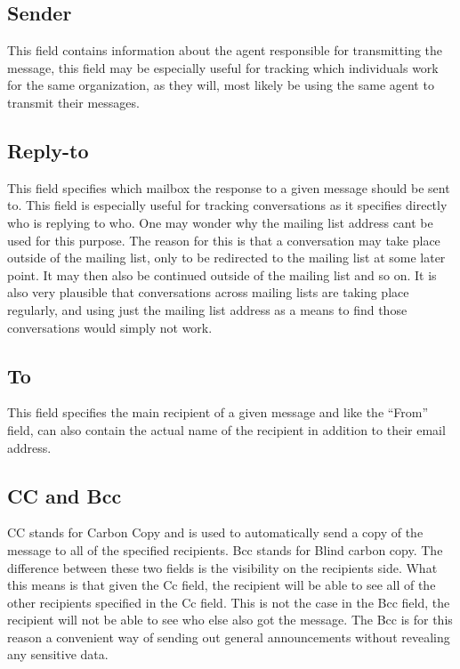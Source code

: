 \documentclass[a4paper,english]{report}
\begin{document}
\subsection{Sender}
This field contains information about the agent responsible for transmitting the message, this field may be especially useful for tracking which individuals work for the same organization, as they will, most likely be using the same agent to transmit their messages.


\subsection{Reply-to}
This field specifies which mailbox the response to a given message should be sent to.
This field is especially useful for tracking conversations as it specifies directly who is replying to who. One may wonder why the mailing list address cant be used for this purpose.
The reason for this is that a conversation may take place outside of the mailing list, only to be redirected to the mailing list at some later point. It may then also be continued outside of the mailing list and so on. It is also very plausible that conversations across mailing lists are taking place regularly, and using just the mailing list address as a means to find those conversations would simply not work.  

\subsection{To}
This field specifies the main recipient of a given message and like the “From” field, can also contain the actual name of the recipient in addition to their email address.

\subsection{CC and Bcc}
CC stands for Carbon Copy and is used to automatically send a copy of the message to all of the specified recipients. Bcc stands for Blind carbon copy. The difference between these two fields is the visibility on the recipients side. What this means is that given the Cc field, the recipient will be able to see all of the other recipients specified in the Cc field. This is not the case in the Bcc field, the recipient will not be able to see who else also got the message. The Bcc is for this reason  a convenient way of sending out general announcements without revealing any sensitive data.
\end{document}
